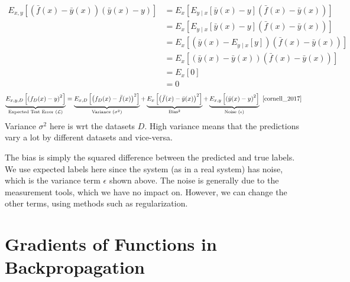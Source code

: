 \documentclass{book}
\numberwithin{equation}{subsection}
\begin{document}
\begin{align}
	E_{x, y} \left[\left(\bar{f}(x) - \bar{y}(x)\right)\left(\bar{y}(x) - y\right)\right] &= E_{x}\left[E_{y \mid x} \left[\bar{y}(x) - y \right] \left(\bar{f}(x) - \bar{y}(x) \right) \right] \\
    &= E_{x} \left[ E_{y \mid x} \left[ \bar{y}(x) - y\right] \left(\bar{f}(x) - \bar{y}(x)\right)\right] \\
    &= E_{x} \left[ \left( \bar{y}(x) - E_{y \mid x} \left [ y \right]\right) \left(\bar{f}(x) - \bar{y}(x)\right)\right] \\
    &= E_{x} \left[ \left( \bar{y}(x) - \bar{y}(x) \right) \left(\bar{f}(x) - \bar{y}(x)\right)\right] \\
    &= E_{x} \left[ 0 \right] \\
    &= 0
\end{align}
\begin{equation}
	\underbrace{E_{x, y, D} \left[\left(f_D(x) - y\right)^{2}\right]}_{\text{Expected Test Error }(\mathcal{L})} = \underbrace{E_{x, D}\left[\left(f_D(x) - \bar{f}(x)\right)^{2}\right]}_{\text{Variance }(\sigma^2)} + \underbrace{E_{x}\left[\left(\bar{f}(x) - \bar{y}(x)\right)^{2}\right]}_\mathrm{Bias^2} + \underbrace{E_{x, y}\left[\left(\bar{y}(x) - y\right)^{2}\right]}_{\text{Noise }(\epsilon)}~\cite{cornell_2017} 
\end{equation}
Variance $\sigma^2$ here is wrt the datasets $D$. High variance means that the predictions vary a lot by different datasets and vice-versa. 

The bias is simply the squared difference between the predicted and true labels. We use expected labels here since the system (as in a real system) has noise, which is the variance term $\epsilon$ shown above. The noise is generally due to the measurement tools, which we have no impact on. However, we can change the other terms, using methods such as regularization.
\chapter{Gradients of Functions in Backpropagation}
\end{document}
